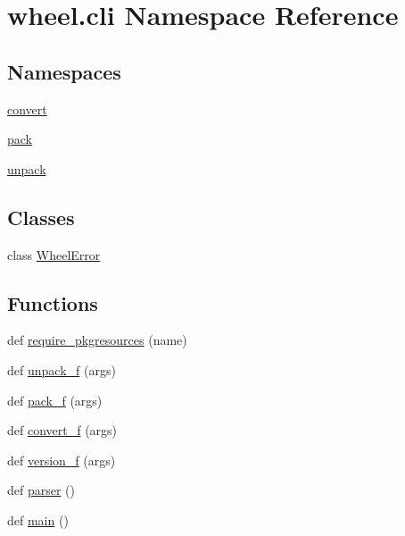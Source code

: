 \hypertarget{namespacewheel_1_1cli}{}\section{wheel.\+cli Namespace Reference}
\label{namespacewheel_1_1cli}
\subsection*{Namespaces}
\begin{DoxyCompactItemize}
\item 
 \hyperlink{namespacewheel_1_1cli_1_1convert}{convert}
\item 
 \hyperlink{namespacewheel_1_1cli_1_1pack}{pack}
\item 
 \hyperlink{namespacewheel_1_1cli_1_1unpack}{unpack}
\end{DoxyCompactItemize}
\subsection*{Classes}
\begin{DoxyCompactItemize}
\item 
class \hyperlink{classwheel_1_1cli_1_1WheelError}{Wheel\+Error}
\end{DoxyCompactItemize}
\subsection*{Functions}
\begin{DoxyCompactItemize}
\item 
def \hyperlink{namespacewheel_1_1cli_a0eedbfc56bb01006797f610f2e59d20b}{require\+\_\+pkgresources} (name)
\item 
def \hyperlink{namespacewheel_1_1cli_aee976c2bcf67303a42567f1924c9a222}{unpack\+\_\+f} (args)
\item 
def \hyperlink{namespacewheel_1_1cli_aa647993da58a45ca360ff98d241cd8a8}{pack\+\_\+f} (args)
\item 
def \hyperlink{namespacewheel_1_1cli_a0433140019e2a2689c1a3526bb73e716}{convert\+\_\+f} (args)
\item 
def \hyperlink{namespacewheel_1_1cli_a27f0083c5bf61185d7daf8ee856aa82c}{version\+\_\+f} (args)
\item 
def \hyperlink{namespacewheel_1_1cli_a8ecdd081a63782cd5cfe77d6a7f5e8ab}{parser} ()
\item 
def \hyperlink{namespacewheel_1_1cli_a920eff645c9f0a1cbe67a7733517f030}{main} ()
\end{DoxyCompactItemize}



